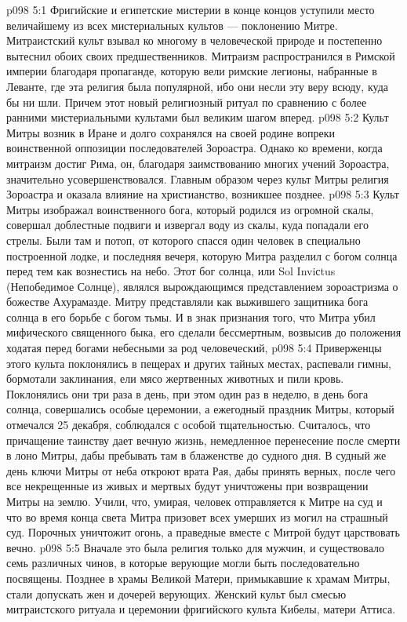\vs p098 5:1 Фригийские и египетские мистерии в конце концов уступили место величайшему из всех мистериальных культов --- поклонению Митре. Митраистский культ взывал ко многому в человеческой природе и постепенно вытеснил обоих своих предшественников. Митраизм распространился в Римской империи благодаря пропаганде, которую вели римские легионы, набранные в Леванте, где эта религия была популярной, ибо они несли эту веру всюду, куда бы ни шли. Причем этот новый религиозный ритуал по сравнению с более ранними мистериальными культами был великим шагом вперед.
\vs p098 5:2 Культ Митры возник в Иране и долго сохранялся на своей родине вопреки воинственной оппозиции последователей Зороастра. Однако ко времени, когда митраизм достиг Рима, он, благодаря заимствованию многих учений Зороастра, значительно усовершенствовался. Главным образом через культ Митры религия Зороастра и оказала влияние на христианство, возникшее позднее.
\vs p098 5:3 \pc Культ Митры изображал воинственного бога, который родился из огромной скалы, совершал доблестные подвиги и извергал воду из скалы, куда попадали его стрелы. Были там и потоп, от которого спасся один человек в специально построенной лодке, и последняя вечеря, которую Митра разделил с богом солнца перед тем как вознестись на небо. Этот бог солнца, или Sol Inviсtus (Непобедимое Солнце), являлся вырождающимся представлением зороастризма о божестве Ахурамазде. Митру представляли как выжившего защитника бога солнца в его борьбе с богом тьмы. И в знак признания того, что Митра убил мифического священного быка, его сделали бессмертным, возвысив до положения ходатая перед богами небесными за род человеческий,
\vs p098 5:4 Приверженцы этого культа поклонялись в пещерах и других тайных местах, распевали гимны, бормотали заклинания, ели мясо жертвенных животных и пили кровь. Поклонялись они три раза в день, при этом один раз в неделю, в день бога солнца, совершались особые церемонии, а ежегодный праздник Митры, который отмечался 25 декабря, соблюдался с особой тщательностью. Считалось, что причащение таинству дает вечную жизнь, немедленное перенесение после смерти в лоно Митры, дабы пребывать там в блаженстве до судного дня. В судный же день ключи Митры от неба откроют врата Рая, дабы принять верных, после чего все некрещенные из живых и мертвых будут уничтожены при возвращении Митры на землю. Учили, что, умирая, человек отправляется к Митре на суд и что во время конца света Митра призовет всех умерших из могил на страшный суд. Порочных уничтожит огонь, а праведные вместе с Митрой будут царствовать вечно.
\vs p098 5:5 Вначале это была религия только для мужчин, и существовало семь различных чинов, в которые верующие могли быть последовательно посвящены. Позднее в храмы Великой Матери, примыкавшие к храмам Митры, стали допускать жен и дочерей верующих. Женский культ был смесью митраистского ритуала и церемонии фригийского культа Кибелы, матери Аттиса.
